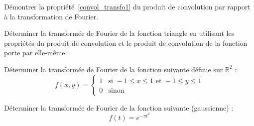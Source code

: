 \exercice Démontrer la propriété~\ref{convol_transfo1} du produit de convolution par rapport à la transformation de Fourier.

\exercice Déterminer la transformée de Fourier de la fonction triangle
en utilisant les propriétés du produit de convolution et le produit
de convolution de la fonction porte par elle-même.

\exercice Déterminer la transformée de Fourier de la fonction suivante définie sur $\mathbb R^2$ :
%
\begin{equation*}
f(x,y) =
\begin{cases}
 1  & \mbox{si } -1 \leq x \leq 1 \mbox{ et } -1 \leq y \leq 1\\
0 & \mbox{sinon}
\end{cases}
\end{equation*}


\exercice Déterminer la transformée de Fourier de la fonction suivante (gaussienne) :
$$f(t) = e^{-\pi t^2}$$